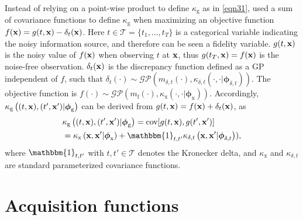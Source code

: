 \documentclass[iicol,sn-basic]{sn-jnl}%
\begin{document}
Instead of relying on a point-wise product to define $\kappa_\text{g}$ as in \cref{eqn31}, \cite{Poloczek2017} used a sum of covariance functions to define $\kappa_\text{g}$ when maximizing an objective function $f({\bf x}) = g(t,{\bf x}) - \delta_t({\bf x})$.
Here $t \in \mathcal{T} = \{t_1,\dots,t_T\}$ is a categorical variable indicating the noisy information source, and therefore can be seen a fidelity variable.
$g(t,{\bf x})$ is the noisy value of $f({\bf x})$ when observing $t$ at ${\bf x}$, thus $g(t_T,{\bf x}) = f({\bf x})$ is the noise-free observation.
$\delta_t({\bf x})$ is the discrepancy function defined as a GP independent of $f$, such that $\delta_t(\cdot) \sim \mathcal{GP}(m_{\delta,t}(\cdot),\kappa_{\delta,t}\left(\cdot,\cdot|{\boldsymbol \phi}_{\delta,t}\right))$.
The objective function is $f(\cdot) \sim \mathcal{GP}(m_\text{f}(\cdot),\kappa_\text{x}\left(\cdot,\cdot|{\boldsymbol \phi}_\text{x}\right))$.
Accordingly, $\kappa_\text{g}\left((t,{\bf x}),(t',{\bf x}')|{\boldsymbol \phi}_\text{g}\right)$ can be derived from $g(t,{\bf x}) = f({\bf x}) + \delta_t({\bf x})$, as
\begin{equation}\label{eqn36}
	\begin{aligned}
		& \kappa_\text{g}\left((t,{\bf x}),(t',{\bf x}')|{\boldsymbol \phi}_\text{g}\right) = \text{cov}[g(t,{\bf x}),g(t',{\bf x}')]\\
		& =\kappa_\text{x}\left({\bf x},{\bf x}'|{\boldsymbol \phi}_\text{x}\right) +  \mathbbm{1}_{t,t'} \kappa_{\delta,t}\left({\bf x},{\bf x}'|{\boldsymbol \phi}_{\delta,t}\right)),
	\end{aligned}
\end{equation}
where $\mathbbm{1}_{t,t'}$ with $t,t' \in \mathcal{T}$ denotes the Kronecker delta, and $\kappa_\text{x}$ and $\kappa_{\delta,t}$ are standard parameterized covariance functions.

\section{Acquisition functions}\label{Sec5}
\end{document}
